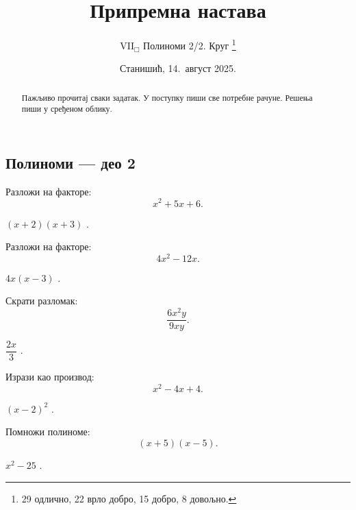 \documentclass[11pt,a5paper,twoside,addpoints,answers]{exam} %
\title{Припремна настава}
\author{$\mathrm{VII}_\Box$ Полиноми 2/2. Круг
 \thanks{
  29 одлично,
  22 врло добро,
  15 добро,
   8 довољно.
 }
}
\date{Станишић, 14.\ август 2025.}
\newcommand{\variant}[3]{#1}
\begin{document}
\maketitle
\thispagestyle{headandfoot}

\ifprintanswers\else
\begin{flushleft}\scriptsize
\gradetable[h]
\end{flushleft}
\fi

\begin{abstract}
Пажљиво прочитај сваки задатак. У поступку пиши све потребне рачуне. Решења пиши у сређеном облику.
\end{abstract}

\begin{questions}

\section*{Полиноми — део 2}

\question[3]
Разложи на факторе:
\[
\variant{
x^2+5x+6
}{
a^2-9
}{
m^2+7m+10
}.
\]
\begin{solution}[\stretch 2]
\variant{
$(x+2)(x+3)$
}{
$(a-3)(a+3)$
}{
$(m+2)(m+5)$
}.
\end{solution}

\question[3]
Разложи на факторе:
\[
\variant{
4x^2-12x
}{
y^2+6y
}{
5p^2-15p
}.
\]
\begin{solution}[\stretch 2]
\variant{
$4x(x-3)$
}{
$y(y+6)$
}{
$5p(p-3)$
}.
\end{solution}

\question[4]
Скрати разломак:
\[
\variant{
\dfrac{6x^2y}{9xy}
}{
\dfrac{15a^3}{20a}
}{
\dfrac{14m^4n}{21m^2n}
}.
\]
\begin{solution}[\stretch 3]
\variant{
$\dfrac{2x}{3}$
}{
$\dfrac{3a^2}{4}$
}{
$\dfrac{2m^2}{3}$
}.
\end{solution}

\ifprintanswers\else\newpage\fi

\question[4]
Изрази као производ:
\[
\variant{
x^2-4x+4
}{
a^2+8a+16
}{
m^2-10m+25
}.
\]
\begin{solution}[\stretch 2]
\variant{
$(x-2)^2$
}{
$(a+4)^2$
}{
$(m-5)^2$
}.
\end{solution}

\question[4]
Помножи полиноме:
\[
\variant{
(x+5)(x-5)
}{
(2a+3)(a+4)
}{
(m-7)(m+2)
}.
\]
\begin{solution}[\stretch 3]
\variant{
$x^2-25$
}{
$2a^2+11a+12$
}{
$m^2-5m-14$
}.
\end{solution}


\end{questions}
\end{document}
